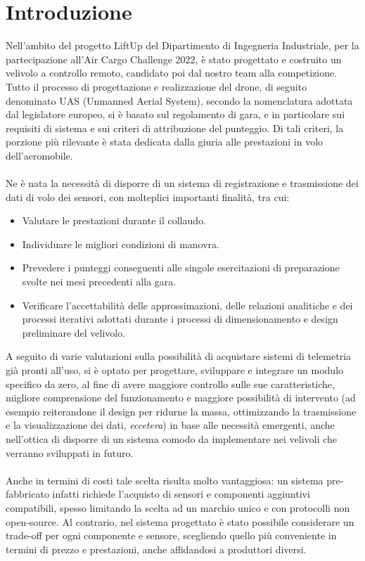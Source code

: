 \documentclass[12pt]{article}
\begin{document}
\section*{Introduzione}
Nell'ambito del progetto LiftUp del Dipartimento di Ingegneria Industriale, per la partecipazione all'Air Cargo Challenge 2022, è stato progettato e costruito un velivolo a controllo remoto, candidato poi dal nostro team alla competizione.
Tutto il processo di progettazione e realizzazione del drone, di seguito denominato UAS (Unmanned Aerial System), secondo la nomenclatura adottata dal legislatore europeo, si è basato sul regolamento di gara, e in particolare sui requisiti di sistema e sui criteri di attribuzione del punteggio. Di tali criteri, la porzione più rilevante è stata dedicata dalla giuria alle prestazioni in volo dell'aeromobile. 
\\\\
Ne è nata la necessità di disporre di un sistema di registrazione e trasmissione dei dati di volo dei sensori, con molteplici importanti finalità, tra cui: 

\begin{itemize}
\item Valutare le prestazioni durante il collaudo.
\item Individuare le migliori condizioni di manovra.
\item Prevedere i punteggi conseguenti alle singole esercitazioni di preparazione svolte nei mesi precedenti alla gara.
\item Verificare l'accettabilità delle approssimazioni, delle relazioni analitiche e dei processi iterativi adottati durante i processi di dimensionamento e design preliminare del velivolo.
\end{itemize}

\noindent
A seguito di varie valutazioni sulla possibilità di acquistare sistemi di telemetria già pronti all'uso, si è optato per progettare, sviluppare e integrare un modulo specifico da zero, al fine di avere maggiore controllo sulle sue caratteristiche, migliore comprensione del funzionamento e maggiore possibilità di intervento (ad esempio reiterandone il design per ridurne la massa, ottimizzando la trasmissione e la visualizzazione dei dati, \textit{eccetera}) in base alle necessità emergenti, anche nell'ottica di disporre di un sistema comodo da implementare nei velivoli che verranno sviluppati in futuro.
\\\\
Anche in termini di costi tale scelta risulta molto vantaggiosa: un sistema pre-fabbricato infatti richiede l'acquisto di sensori e componenti aggiuntivi compatibili, spesso limitando la scelta ad un marchio unico e con protocolli non open-source. Al contrario, nel sistema progettato è stato possibile considerare un trade-off per ogni componente e sensore, scegliendo quello più conveniente in termini di prezzo e prestazioni, anche affidandosi a produttori diversi. 
\end{document}
